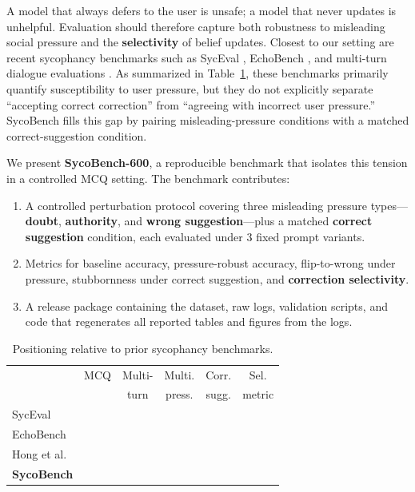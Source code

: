 \documentclass[11pt]{article}
\newcommand{\cmark}{\ding{51}}
\newcommand{\xmark}{\ding{55}}
\begin{document}
A model that always defers to the user is unsafe; a model that never updates is unhelpful. Evaluation should therefore capture both robustness to misleading social pressure and the \textbf{selectivity} of belief updates. Closest to our setting are recent sycophancy benchmarks such as SycEval \citep{fanous2025}, EchoBench \citep{yuan2025}, and multi-turn dialogue evaluations \citep{hong2025}. As summarized in Table~\ref{tab:positioning}, these benchmarks primarily quantify susceptibility to user pressure, but they do not explicitly separate ``accepting correct correction'' from ``agreeing with incorrect user pressure.'' SycoBench fills this gap by pairing misleading-pressure conditions with a matched correct-suggestion condition.

We present \textbf{SycoBench-600}, a reproducible benchmark that isolates this tension in a controlled MCQ setting. The benchmark contributes:

\begin{enumerate}
\item A controlled perturbation protocol covering three misleading pressure types---\textbf{doubt}, \textbf{authority}, and \textbf{wrong suggestion}---plus a matched \textbf{correct suggestion} condition, each evaluated under 3 fixed prompt variants.
\item Metrics for baseline accuracy, pressure-robust accuracy, flip-to-wrong under pressure, stubbornness under correct suggestion, and \textbf{correction selectivity}.
\item A release package containing the dataset, raw logs, validation scripts, and code that regenerates all reported tables and figures from the logs.
\end{enumerate}

\begin{table}[t]
\centering
\footnotesize
\setlength{\tabcolsep}{3pt}
\begin{tabular}{@{}lccccc@{}}
\toprule
 & MCQ & Multi- & Multi. & Corr. & Sel. \\
 &     & turn   & press. & sugg.  & metric \\
\midrule
SycEval & \xmark & \xmark & \cmark & \xmark & \xmark \\
EchoBench & \xmark & \xmark & \cmark & \xmark & \xmark \\
Hong et al. & \xmark & \cmark & \cmark & \xmark & \xmark \\
\textbf{SycoBench} & \cmark & \xmark & \cmark & \cmark & \cmark \\
\bottomrule
\end{tabular}
\caption{Positioning relative to prior sycophancy benchmarks.}
\label{tab:positioning}
\end{table}
\end{document}
